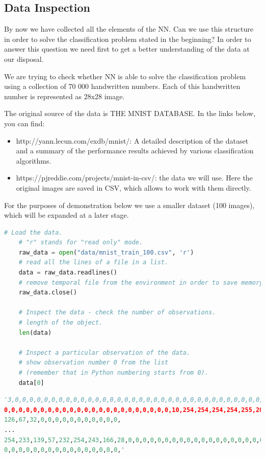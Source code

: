\subsection{Data Inspection}

By now we have collected all the elements of the NN. Can we use this structure in order to solve the classification problem stated in the beginning? In order to answer this question we need first to get a better understanding of the data at our disposal. 

We are trying to check whether NN is able to solve the classification problem using a collection of 70 000 handwritten numbers. Each of this handwritten number is represented as 28x28 image. 

The original source of the data is THE MNIST DATABASE. In the links below, you can find: 

\begin{itemize}
    \item http://yann.lecun.com/exdb/mnist/: A detailed description of the dataset and a summary of the performance results achieved by various classification algorithms.
    \item https://pjreddie.com/projects/mnist-in-csv/: the data we will use. Here the original images are saved in CSV, which allows to work with them directly.
\end{itemize}

For the purposes of demonstration below we use a smaller dataset (100 images), which will be expanded at a later stage.


\begin{lstlisting}[language=Python]
    # Load the data.
    # "r" stands for "read only" mode.
    raw_data = open("data/mnist_train_100.csv", 'r') 
    # read all the lines of a file in a list.
    data = raw_data.readlines() 
    # remove temporal file from the environment in order to save memory.
    raw_data.close() 

    # Inspect the data - check the number of observations.
    # length of the object.
    len(data) 

    # Inspect a particular observation of the data.
    # show observation number 0 from the list
    # (remember that in Python numbering starts from 0).
    data[0]
\end{lstlisting}

\begin{lstlisting}[language=Python]
'3,0,0,0,0,0,0,0,0,0,0,0,0,0,0,0,0,0,0,0,0,0,0,0,0,0,0,0,0,0,0,0,0,0,0,
0,0,0,0,0,0,0,0,0,0,0,0,0,0,0,0,0,0,0,0,0,0,0,10,254,254,254,254,255,209,
126,67,32,0,0,0,0,0,0,0,0,0,0,0,
...
254,233,139,57,232,254,243,166,28,0,0,0,0,0,0,0,0,0,0,0,0,0,0,0,0,0,0,0,0,
0,0,0,0,0,0,0,0,0,0,0,0,0,0,0,0,'
\end{lstlisting}

